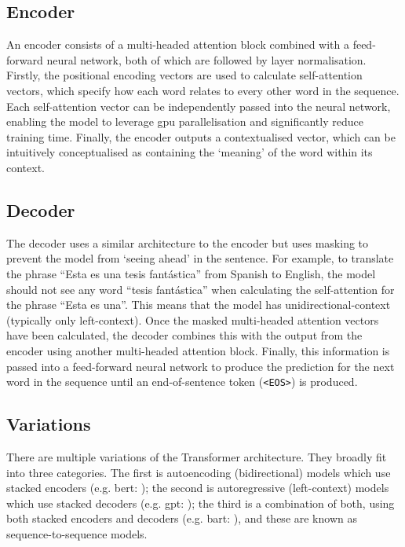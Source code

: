 \subsection{Encoder}\label{sec:transformers_encoder}
An encoder consists of a multi-headed attention block combined with a feed-forward neural network, both of which are followed by layer normalisation. Firstly, the positional encoding vectors are used to calculate self-attention vectors, which specify how each word relates to every other word in the sequence. Each self-attention vector can be independently passed into the neural network, enabling the model to leverage \acrshort{gpu} parallelisation and significantly reduce training time. Finally, the encoder outputs a contextualised vector, which can be intuitively conceptualised as containing the `meaning' of the word within its context.

\subsection{Decoder}
The decoder uses a similar architecture to the encoder but uses masking to prevent the model from `seeing ahead' in the sentence. For example, to translate the phrase ``Esta es una tesis fantástica'' from Spanish to English, the model should not see any word ``tesis fantástica'' when calculating the self-attention for the phrase ``Esta es una''. This means that the model has unidirectional-context (typically only left-context). Once the masked multi-headed attention vectors have been calculated, the decoder combines this with the output from the encoder using another multi-headed attention block. Finally, this information is passed into a feed-forward neural network to produce the prediction for the next word in the sequence until an end-of-sentence token (\texttt{<EOS>}) is produced.

\subsection{Variations}
There are multiple variations of the Transformer architecture.
They broadly fit into three categories. The first is autoencoding (bidirectional) models which use stacked encoders (e.g. \acrshort{bert}: \citet{devlin2019bert}); the second is autoregressive (left-context) models which use stacked decoders (e.g. \acrshort{gpt}: \citet{radford2018improving}); the third is a combination of both, using both stacked encoders and decoders (e.g. \acrshort{bart}: \citet{lewis2019bart}), and these are known as sequence-to-sequence models. 

